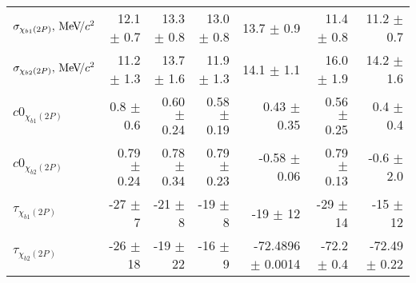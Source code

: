 \begin{table}[H]
{{\begin{tabular}{lrrrrrr}
\rule{0pt}{4ex}$\sigma_{\chi_{b1}(2P)}, {\mathrm{\,Me\kern -0.1em V\!/}c^2}$ & 12.1 $\pm$ 0.7 & 13.3 $\pm$ 0.8 & 13.0 $\pm$ 0.8 & 13.7 $\pm$ 0.9 & 11.4 $\pm$ 0.8 & 11.2 $\pm$ 0.7\\
$\sigma_{\chi_{b2}(2P)}, {\mathrm{\,Me\kern -0.1em V\!/}c^2}$ & 11.2 $\pm$ 1.3 & 13.7 $\pm$ 1.6 & 11.9 $\pm$ 1.3 & 14.1 $\pm$ 1.1 & 16.0 $\pm$ 1.9 & 14.2 $\pm$ 1.6\\

\rule{0pt}{4ex}$c0_{\chi_{b1}(2P)}$ & 0.8 $\pm$ 0.6 & 0.60 $\pm$ 0.24 & 0.58 $\pm$ 0.19 & 0.43 $\pm$ 0.35 & 0.56 $\pm$ 0.25 & 0.4 $\pm$ 0.4\\
$c0_{\chi_{b2}(2P)}$ & 0.79 $\pm$ 0.24 & 0.78 $\pm$ 0.34 & 0.79 $\pm$ 0.23 & -0.58 $\pm$ 0.06 & 0.79 $\pm$ 0.13 & -0.6 $\pm$ 2.0\\

\rule{0pt}{4ex}$\tau_{\chi_{b1}(2P)}$ & -27 $\pm$ 7 & -21 $\pm$ 8 & -19 $\pm$ 8 & -19 $\pm$ 12 & -29 $\pm$ 14 & -15 $\pm$ 12\\
$\tau_{\chi_{b2}(2P)}$ & -26 $\pm$ 18 & -19 $\pm$ 22 & -16 $\pm$ 9 & -72.4896 $\pm$ 0.0014 & -72.2 $\pm$ 0.4 & -72.49 $\pm$ 0.22\\
\bottomrule
\end{tabular}
} %

} %
\label{tab:mc:chib2p_ups2s:fits}
\end{table}

